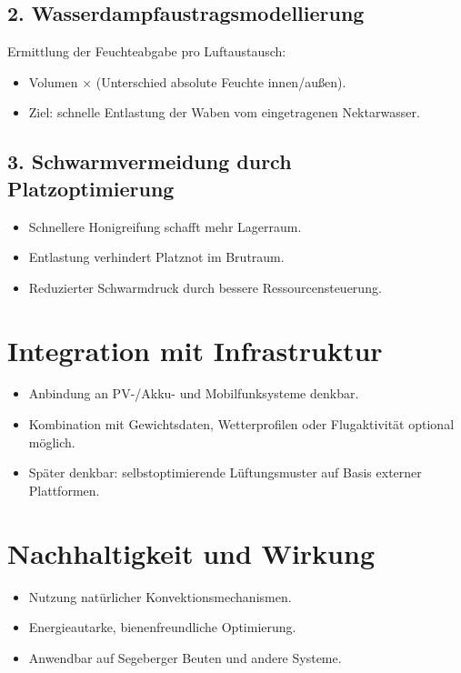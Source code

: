 \documentclass[11pt,a4paper]{article}
\begin{document}
\subsection{2. Wasserdampfaustragsmodellierung}
Ermittlung der Feuchteabgabe pro Luftaustausch:
\begin{itemize}[topsep=2pt]
  \item Volumen \( \times \) (Unterschied absolute Feuchte innen/au\ss{}en).
  \item Ziel: schnelle Entlastung der Waben vom eingetragenen Nektarwasser.
\end{itemize}

\subsection{3. Schwarmvermeidung durch Platzoptimierung}
\begin{itemize}[topsep=2pt]
  \item Schnellere Honigreifung schafft mehr Lagerraum.
  \item Entlastung verhindert Platznot im Brutraum.
  \item Reduzierter Schwarmdruck durch bessere Ressourcensteuerung.
\end{itemize}

\section{Integration mit Infrastruktur}
\begin{itemize}[topsep=2pt]
  \item Anbindung an PV-/Akku- und Mobilfunksysteme denkbar.
  \item Kombination mit Gewichtsdaten, Wetterprofilen oder Flugaktivit\"at optional m\"oglich.
  \item Sp\"ater denkbar: selbstoptimierende L\"uftungsmuster auf Basis externer Plattformen.
\end{itemize}

\section{Nachhaltigkeit und Wirkung}
\begin{itemize}[topsep=2pt]
  \item Nutzung nat\"urlicher Konvektionsmechanismen.
  \item Energieautarke, bienenfreundliche Optimierung.
  \item Anwendbar auf Segeberger Beuten und andere Systeme.
\end{itemize}
\end{document}
